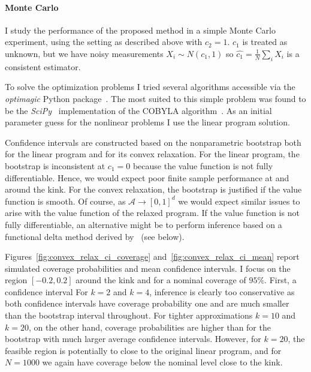 \documentclass[12pt,a4paper,english]{article} %
\numberwithin{equation}{section}
\theoremstyle{definition}
\theoremstyle{remark}
\theoremstyle{plain}
\begin{document}
\paragraph{Monte Carlo}
I study the performance of the proposed method in a simple Monte Carlo experiment, using the setting as described above with $c_2=1$.
$c_1$ is treated as unknown, but we have noisy measurements $X_i \sim N(c_1, 1)$ so $\hat{c_1} = \frac{1}{N}\sum_i X_i$ is a consistent estimator.

To solve the optimization problems I tried several algorithms accessible via the \textit{optimagic} Python package~\citep{Gabler2024}.
The most suited to this simple problem was found to be the \textit{SciPy}~\citep{scipy} implementation of the COBYLA algorithm~\citep{cobyla_powell1994direct}.
As an initial parameter guess for the nonlinear problems I use the linear program solution.

Confidence intervals are constructed based on the nonparametric bootstrap both for the linear program and for its convex relaxation.
For the linear program, the bootstrap is inconsistent at $c_1=0$ because the value function is not fully differentiable.
Hence, we would expect poor finite sample performance at and around the kink.
For the convex relaxation, the bootstrap is justified if the value function is smooth.
Of course, as $\mathcal{A}\to [0,1]^d$ we would expect similar issues to arise with the value function of the relaxed program.
If the value function is not fully differentiable, an alternative might be to perform inference based on a functional delta method derived by~\cite{shapiro1991asymptotic} (see below).

Figures~\ref{fig:convex_relax_ci_coverage} and~\ref{fig:convex_relax_ci_mean} report simulated coverage probabilities and mean confidence intervals.
I focus on the region $[-0.2, 0.2]$ around the kink and for a nominal coverage of $95\%$.
First, a confidence interval
For $k=2$ and $k=4$, inference is clearly too conservative as both confidence intervals have coverage probability one and are much smaller than the bootstrap interval throughout.
For tighter approximations $k=10$ and $k=20$, on the other hand, coverage probabilities are higher than for the bootstrap with much larger average confidence intervals.
However, for $k=20$, the feasible region is potentially to close to the original linear program, and for $N=1000$ we again have coverage below the nominal level close to the kink.
\end{document}
